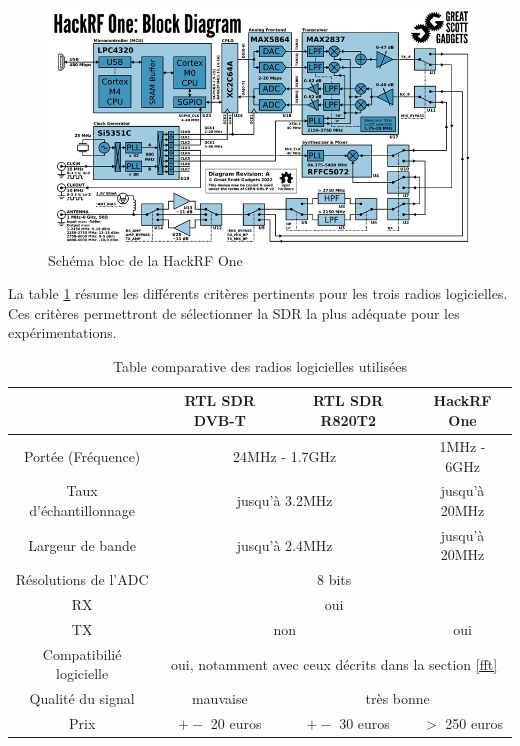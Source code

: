 \begin{figure}[h]
\centering

\includegraphics[scale=0.8]{images/SBhackrf.png}
\caption{Schéma bloc de la HackRF One\protect\footnotemark[10]}\label{term3001}
\end{figure}

 
La table \ref{table1} résume les différents critères pertinents pour les trois radios logicielles. Ces critères permettront de sélectionner la \ac{SDR} la plus adéquate pour les expérimentations.


\begin{table}[h]
\centering
\begin{adjustbox}{width=1\textwidth}
\begin{tabular}{|c|c|c|c|}
\hline
\multicolumn{1}{|c|}{} & \multicolumn{1}{c|}{RTL SDR DVB-T} & \multicolumn{1}{c|}{RTL SDR R820T2} & \multicolumn{1}{c|}{HackRF One}\\
\hline
Portée (Fréquence) & \multicolumn{2}{c|}{24MHz - 1.7GHz} & 1MHz - 6GHz \\
\hline
Taux d'échantillonnage & \multicolumn{2}{c|}{jusqu'à 3.2MHz} & jusqu'à 20MHz \\
\hline
Largeur de bande & \multicolumn{2}{c|}{jusqu'à 2.4MHz} & jusqu'à 20MHz  \\
\hline
Résolutions de l'ADC & \multicolumn{3}{c|}{8 bits} \\
\hline
RX & \multicolumn{3}{c|}{oui} \\
\hline
TX & \multicolumn{2}{c|}{non} & oui \\
\hline
Compatibilié logicielle & \multicolumn{3}{c|}{oui, notamment avec ceux décrits dans la section \ref{fft}} \\
\hline
Qualité du signal & mauvaise &\multicolumn{2}{c|}{très bonne}\\
\hline
Prix & $+-$ 20 euros & $+-$ 30 euros & $>$ 250 euros \\
\hline
\end{tabular}
\end{adjustbox}
\caption{Table comparative des radios logicielles utilisées}
\label{table1}
\end{table}



